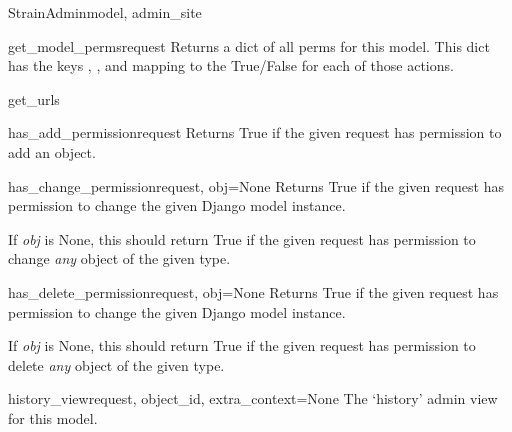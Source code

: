 \documentclass[letterpaper,10pt,english]{sphinxmanual}
\begin{document}
\begin{classdesc}{StrainAdmin}{model, admin\_site}
\hypertarget{animal.admin.StrainAdmin.get_model_perms}{}\begin{methoddesc}{get\_model\_perms}{request}
Returns a dict of all perms for this model. This dict has the keys
, , and  mapping to the True/False for each
of those actions.
\end{methoddesc}

\hypertarget{animal.admin.StrainAdmin.get_urls}{}\begin{methoddesc}{get\_urls}{}\end{methoddesc}

\hypertarget{animal.admin.StrainAdmin.has_add_permission}{}\begin{methoddesc}{has\_add\_permission}{request}
Returns True if the given request has permission to add an object.
\end{methoddesc}

\hypertarget{animal.admin.StrainAdmin.has_change_permission}{}\begin{methoddesc}{has\_change\_permission}{request, obj=None}
Returns True if the given request has permission to change the given
Django model instance.

If \emph{obj} is None, this should return True if the given request has
permission to change \emph{any} object of the given type.
\end{methoddesc}

\hypertarget{animal.admin.StrainAdmin.has_delete_permission}{}\begin{methoddesc}{has\_delete\_permission}{request, obj=None}
Returns True if the given request has permission to change the given
Django model instance.

If \emph{obj} is None, this should return True if the given request has
permission to delete \emph{any} object of the given type.
\end{methoddesc}

\hypertarget{animal.admin.StrainAdmin.history_view}{}\begin{methoddesc}{history\_view}{request, object\_id, extra\_context=None}
The `history' admin view for this model.
\end{methoddesc}


\end{classdesc}
\end{document}
